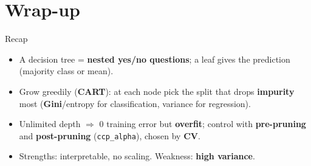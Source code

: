 \documentclass[aspectratio=169]{beamer}
\begin{document}
\section*{Wrap-up}

\begin{frame}{Recap}
  \begin{itemize}\small
    \item A decision tree = \textbf{nested yes/no questions}; a leaf gives the
      prediction (majority class or mean).
    \item Grow greedily (\textbf{CART}): at each node pick the split that drops
      \textbf{impurity} most (\textbf{Gini}/entropy for classification, variance for
      regression).
    \item Unlimited depth $\Rightarrow$ 0 training error but \textbf{overfit}; control
      with \textbf{pre-pruning} and \textbf{post-pruning} (\texttt{ccp\_alpha}), chosen
      by \textbf{CV}.
    \item Strengths: interpretable, no scaling. Weakness: \textbf{high variance}.
  \end{itemize}
  \vfill
\end{frame}
\end{document}

